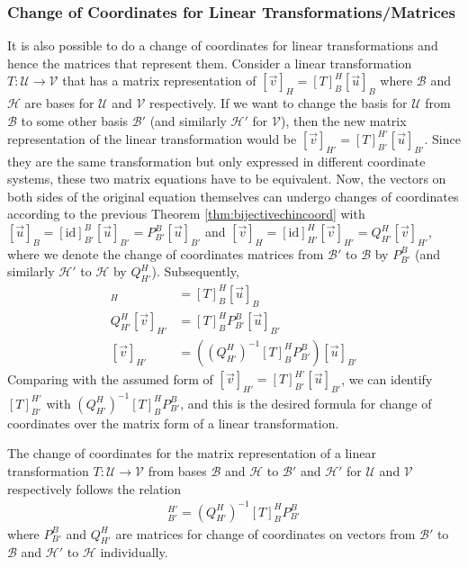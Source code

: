 \subsubsection{Change of Coordinates for Linear Transformations/Matrices}

It is also possible to do a change of coordinates for linear transformations and hence the matrices that represent them. Consider a linear transformation $T: \mathcal{U} \to \mathcal{V}$ that has a matrix representation of $[\vec{v}]_H = [T]_B^H[\vec{u}]_B$ where $\mathcal{B}$ and $\mathcal{H}$ are bases for $\mathcal{U}$ and $\mathcal{V}$ respectively. If we want to change the basis for $\mathcal{U}$ from $\mathcal{B}$ to some other basis $\mathcal{B}'$ (and similarly $\mathcal{H}'$ for $\mathcal{V}$), then the new matrix representation of the linear transformation would be $[\vec{v}]_{H'} = [T]_{B'}^{H'}[\vec{u}]_{B'}$. Since they are the same transformation but only expressed in different coordinate systems, these two matrix equations have to be equivalent. Now, the vectors on both sides of the original equation themselves can undergo changes of coordinates according to the previous Theorem \ref{thm:bijectivechincoord} with $[\vec{u}]_B = [\text{id}]_{B'}^B [\vec{u}]_{B'} = P_{B'}^B [\vec{u}]_{B'}$ and $[\vec{v}]_{H} = [\text{id}]_{H'}^{H} [\vec{v}]_{H'} = Q_{H'}^H [\vec{v}]_{H'}$, where we denote the change of coordinates matrices from $\mathcal{B'}$ to $\mathcal{B}$ by $P_{B'}^{B}$ (and similarly $\mathcal{H'}$ to $\mathcal{H}$ by $Q_{H'}^{H}$). Subsequently,
\begin{align*}
[\vec{v}]_H &= [T]_B^H[\vec{u}]_B \\
Q_{H'}^H [\vec{v}]_{H'} &= [T]_B^H P_{B'}^B [\vec{u}]_{B'} \\
[\vec{v}]_{H'} &= \left( (Q_{H'}^H)^{-1} [T]_B^H P_{B'}^B \right) [\vec{u}]_{B'}
\end{align*}
Comparing with the assumed form of $[\vec{v}]_{H'} = [T]_{B'}^{H'}[\vec{u}]_{B'}$, we can identify $[T]_{B'}^{H'}$ with $(Q_{H'}^H)^{-1} [T]_B^H P_{B'}^B$, and this is the desired formula for change of coordinates over the matrix form of a linear transformation.
\begin{proper}
\label{proper:chcoordsmat}
The change of coordinates for the matrix representation of a linear transformation $T: \mathcal{U} \to \mathcal{V}$ from bases $\mathcal{B}$ and $\mathcal{H}$ to $\mathcal{B}'$ and $\mathcal{H}'$ for $\mathcal{U}$ and $\mathcal{V}$ respectively follows the relation
\begin{align}
[T]_{B'}^{H'} = (Q_{H'}^H)^{-1} [T]_B^H P_{B'}^B \label{eqn:coordchangelintrans}
\end{align}
where $P_{B'}^{B}$ and $Q_{H'}^{H}$ are matrices for change of coordinates on vectors from $\mathcal{B'}$ to $\mathcal{B}$ and $\mathcal{H'}$ to $\mathcal{H}$ individually.
\end{proper}
